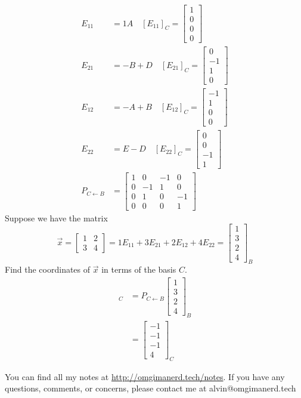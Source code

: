 \documentclass{math}
\begin{document}
\begin{align*}
  E_{11} &= 1A \quad
    [E_{11}]_C = \begin{bmatrix}1 \\ 0 \\ 0 \\ 0\end{bmatrix} \\
  E_{21} &= -B+D \quad
    [E_{21}]_C = \begin{bmatrix}0 \\ -1 \\ 1 \\ 0\end{bmatrix} \\
  E_{12} &= -A+B \quad
    [E_{12}]_C = \begin{bmatrix}-1 \\ 1 \\ 0 \\ 0\end{bmatrix} \\
  E_{22} &= E-D \quad
    [E_{22}]_C = \begin{bmatrix}0 \\ 0 \\ -1 \\ 1\end{bmatrix} \\
  P_{C\leftarrow B} &= \begin{bmatrix}
    1 & 0 & -1 & 0 \\
    0 & -1 & 1 & 0 \\
    0 & 1 & 0 & -1 \\
    0 & 0 & 0 & 1
  \end{bmatrix}
\end{align*}
Suppose we have the matrix
\[ \vec{x} = \begin{bmatrix}1 & 2 \\ 3 & 4\end{bmatrix} =
  1E_{11}+3E_{21}+2E_{12}+4E_{22} =
  \begin{bmatrix}1 \\ 3 \\ 2 \\ 4\end{bmatrix}_B \]
Find the coordinates of \( \vec{x} \) in terms of the basis \( C \).
\begin{align*}
  [\vec{x}]_C &= P_{C\leftarrow B}\begin{bmatrix}
    1 \\ 3 \\ 2 \\ 4
  \end{bmatrix}_B \\
  &= \begin{bmatrix}-1 \\ -1 \\ -1 \\ 4\end{bmatrix}_C
\end{align*}

\begin{center}
  You can find all my notes at \url{http://omgimanerd.tech/notes}. If you have
  any questions, comments, or concerns, please contact me at
  alvin@omgimanerd.tech
\end{center}
\end{document}
